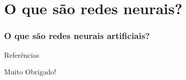\documentclass[aspectratio=169]{beamer}
\begin{document}
\section{O que são redes neurais?}
\begin{frame}
	\frametitle{O que são redes neurais artificiais?}
	\justifying
\end{frame}

\appendix

\begin{frame}{Referências}
    \tiny
    
    
\end{frame}

\begin{frame}[plain,c]
    \begin{center}
    \Huge Muito Obrigado!
    \end{center}
\end{frame}
\end{document}
